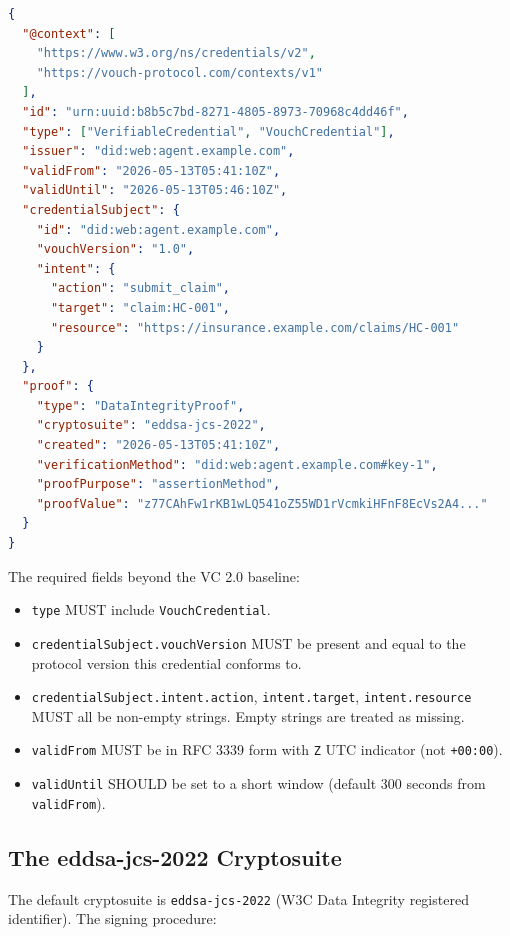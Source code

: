 \documentclass[11pt,a4paper,twocolumn]{article}
\begin{document}
\begin{lstlisting}[language=json]
{
  "@context": [
    "https://www.w3.org/ns/credentials/v2",
    "https://vouch-protocol.com/contexts/v1"
  ],
  "id": "urn:uuid:b8b5c7bd-8271-4805-8973-70968c4dd46f",
  "type": ["VerifiableCredential", "VouchCredential"],
  "issuer": "did:web:agent.example.com",
  "validFrom": "2026-05-13T05:41:10Z",
  "validUntil": "2026-05-13T05:46:10Z",
  "credentialSubject": {
    "id": "did:web:agent.example.com",
    "vouchVersion": "1.0",
    "intent": {
      "action": "submit_claim",
      "target": "claim:HC-001",
      "resource": "https://insurance.example.com/claims/HC-001"
    }
  },
  "proof": {
    "type": "DataIntegrityProof",
    "cryptosuite": "eddsa-jcs-2022",
    "created": "2026-05-13T05:41:10Z",
    "verificationMethod": "did:web:agent.example.com#key-1",
    "proofPurpose": "assertionMethod",
    "proofValue": "z77CAhFw1rKB1wLQ541oZ55WD1rVcmkiHFnF8EcVs2A4..."
  }
}
\end{lstlisting}

The required fields beyond the VC 2.0 baseline:

\begin{itemize}[leftmargin=*]
\item \verb|type| MUST include \verb|VouchCredential|.
\item \verb|credentialSubject.vouchVersion| MUST be present and equal to the protocol version this credential conforms to.
\item \verb|credentialSubject.intent.action|, \verb|intent.target|, \verb|intent.resource| MUST all be non-empty strings. Empty strings are treated as missing.
\item \verb|validFrom| MUST be in RFC 3339 form with \verb|Z| UTC indicator (not \verb|+00:00|).
\item \verb|validUntil| SHOULD be set to a short window (default 300 seconds from \verb|validFrom|).
\end{itemize}

\subsection{The eddsa-jcs-2022 Cryptosuite}

The default cryptosuite is \texttt{eddsa-jcs-2022} (W3C Data Integrity registered identifier). The signing procedure:
\end{document}
